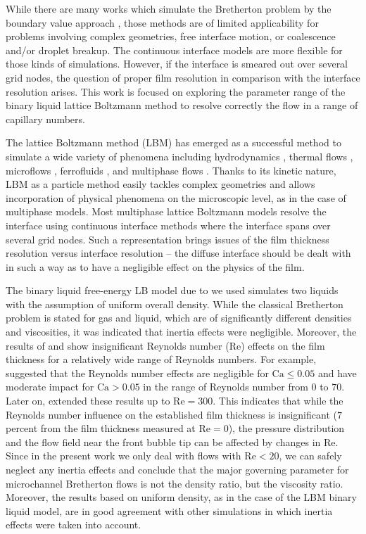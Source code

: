 \documentclass[preprint,12pt]{elsarticle}
\newcommand{\Ca}{\mathrm{Ca}}
\renewcommand{\Re}{\mathrm{Re}}
\begin{document}
While there are many works which simulate the Bretherton problem by the boundary value approach
\cite{ingham-plates,heil-bretherton}, those methods are of limited applicability for problems
involving complex geometries, free interface motion, or coalescence and/or
droplet breakup. The continuous interface models are more flexible for those kinds of simulations.
However, if the interface is smeared out over several grid nodes, the question of
proper film resolution in comparison with the interface resolution arises.  This work is focused on
exploring the parameter range of the binary liquid lattice
Boltzmann method to resolve correctly the flow in a range of capillary numbers.

The lattice Boltzmann method (LBM) has emerged as a successful method to simulate
a wide variety of phenomena including hydrodynamics \cite{yu}, thermal flows
\cite{karlin-minimalmodels}, microflows \cite{ansumali-small-knudsen},
ferrofluids \cite{kuzmin-aniso}, and multiphase flows
\cite{swift,Shan-chen:extended}. Thanks to its kinetic nature, LBM as a particle
method easily tackles complex geometries and allows incorporation of
physical phenomena on the microscopic level, as in the case of multiphase models. Most
multiphase lattice Boltzmann models \cite{swift, Shan-chen:extended} resolve
the interface using continuous interface methods where the interface spans over several grid nodes.
Such a representation
brings issues of the film thickness resolution versus interface
resolution -- the diffuse interface should be dealt with in such a way as to have a
negligible effect on the physics of the film.

The binary liquid free-energy LB model due to \citet{swift} we used
simulates two liquids with the assumption of uniform overall
density. While the classical Bretherton problem is stated for gas and liquid, which are of
significantly
different densities and viscosities, it was indicated \cite{bretherton} that inertia effects were
negligible. Moreover, the results of \citet{giavedoni-numerical} and \citet{heil-bretherton} show
{\color{red} insignificant} Reynolds number ($\Re$) effects on the film thickness for a relatively wide
range of Reynolds
numbers. 
{\color{red} For example, \citet{giavedoni-numerical} suggested that the Reynolds number effects
are negligible for $\Ca\leq0.05$ and have moderate impact for $\Ca>0.05$ in the range of Reynolds
number from $0$ to $70$. Later on, \citet{heil-bretherton} extended these results up to
$\Re = 300$. This indicates that while the Reynolds number influence on the established film thickness is insignificant
($7$ percent from the film thickness measured at $\Re=0$), the pressure distribution and the flow field near the front bubble tip
can be affected by changes in $\Re$.  Since in the present work we only deal with flows with $\Re < 20$, we can safely
neglect any inertia effects and conclude that the major governing parameter for microchannel Bretherton flows is not the density ratio,
but the
viscosity ratio}. Moreover, the results based on uniform density, as in the case of the LBM
binary liquid model, are in good agreement with other simulations
\cite{giavedoni-numerical,heil-bretherton} in which inertia effects were taken into account.
\end{document}
